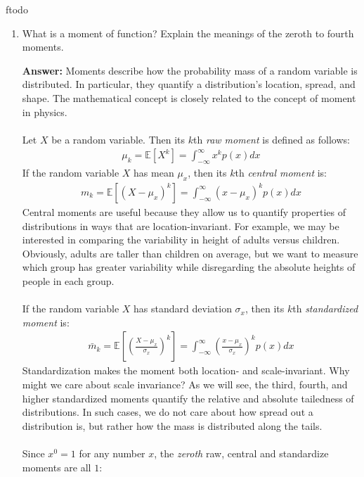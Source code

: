 ƒtodo\documentclass{article}
\newenvironment{QandA}{\begin{enumerate}[label=\arabic*.]}{\end{enumerate}}
\newenvironment{answer}{\par\normalfont \textbf{Answer:}}{}
\newcommand{\Exp}[1]{\mathbb{E}\left[ #1 \right]}
\begin{document}
\begin{QandA}
    \item What is a moment of function? Explain the meanings of the zeroth to fourth moments.
    \begin{answer}
        Moments describe how the probability mass of a random variable is distributed. In particular, they quantify a distribution's location, spread, and shape. The mathematical concept is closely related to the concept of moment in physics.\\\\
        Let $X$ be a random variable. Then its $k$th \textit{raw moment} is defined as follows:
        \begin{align*}
            \mu_k = \Exp{X^k} = \int_{-\infty}^{\infty} x^k p(x)dx
        \end{align*}
        If the random variable $X$ has mean $\mu_x$, then its $k$th \textit{central moment} is:
        \begin{align*}
            m_k = \Exp{(X - \mu_x)^k} = \int_{-\infty}^{\infty} (x-\mu_x)^k p(x) dx
        \end{align*}
        Central moments are useful because they allow us to quantify properties of distributions in ways that are location-invariant. For example, we may be interested in comparing the variability in height of adults versus children. Obviously, adults are taller than children on average, but we want to measure which group has greater variability while disregarding the absolute heights of people in each group.\\\\
        If the random variable $X$ has standard deviation $\sigma_x$, then its $k$th \textit{standardized moment} is:
        \begin{align*}
            \bar{m}_k = \Exp{\left( \frac{X - \mu_x}{\sigma_x} \right)^k} = \int_{-\infty}^{\infty} \left(\frac{x-\mu_x}{\sigma_x}\right)^k p(x) dx
        \end{align*}
        Standardization makes the moment both location- and scale-invariant. Why might we care about scale invariance? As we will see, the third, fourth, and higher standardized moments quantify the relative and absolute tailedness of distributions. In such cases, we do not care about how spread out a distribution is, but rather how the mass is distributed along the tails.\\\\
        Since $x^0 = 1$ for any number $x$, the \emph{zeroth} raw, central and standardize moments are all $1$:
        \begin{align*}

\end{align*}
\end{answer}
\end{QandA}
\end{document}
